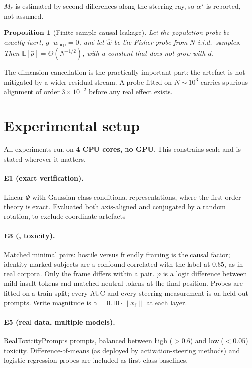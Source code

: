 \documentclass[11pt]{article}
\newtheorem{proposition}{Proposition}
\theoremstyle{definition}
\theoremstyle{remark}
\newcommand{\gbar}{\bar{g}}
\begin{document}
$M_\ell$ is estimated by second differences along the steering ray, so
$\alpha^\star$ is reported, not assumed.

\begin{proposition}[Finite-sample causal leakage]
\label{prop:leak}
Let the population probe be exactly inert, $\gbar^\top w_{\mathrm{pop}}=0$, and
let $\hat{w}$ be the Fisher probe from $N$ i.i.d.\ samples. Then
$\mathbb{E}[\hat{\rho}] = \Theta(N^{-1/2})$, with a constant that does
\emph{not} grow with $d$.
\end{proposition}

The dimension-cancellation is the practically important part: the artefact is
not mitigated by a wider residual stream. A probe fitted on $N\sim10^3$ carries
spurious alignment of order $3\times10^{-2}$ before any real effect exists.

\section{Experimental setup}
\label{sec:setup-exp}

All experiments run on \textbf{4 CPU cores, no GPU}. This constrains scale and
is stated wherever it matters.

\paragraph{E1 (exact verification).} Linear $\Phi$ with Gaussian
class-conditional representations, where the first-order theory is exact.
Evaluated both axis-aligned and conjugated by a random rotation, to exclude
coordinate artefacts.

\paragraph{E3 (\EthreeModel, toxicity).} Matched minimal pairs: hostile versus
friendly framing is the causal factor; identity-marked subjects are a confound
correlated with the label at $0.85$, as in real corpora. Only the frame differs
within a pair. $\varphi$ is a logit difference between mild insult tokens and
matched neutral tokens at the final position. Probes are fitted on a train split;
every AUC and every steering measurement is on held-out prompts. Write magnitude
is $\alpha=0.10\cdot\overline{\|x_\ell\|}$ at each layer.

\paragraph{E5 (real data, multiple models).} \EfiveN{} RealToxicityPrompts
prompts, balanced between high ($>0.6$) and low ($<0.05$) toxicity.
Difference-of-means (as deployed by activation-steering methods) and
logistic-regression probes are included as first-class baselines.
\end{document}
